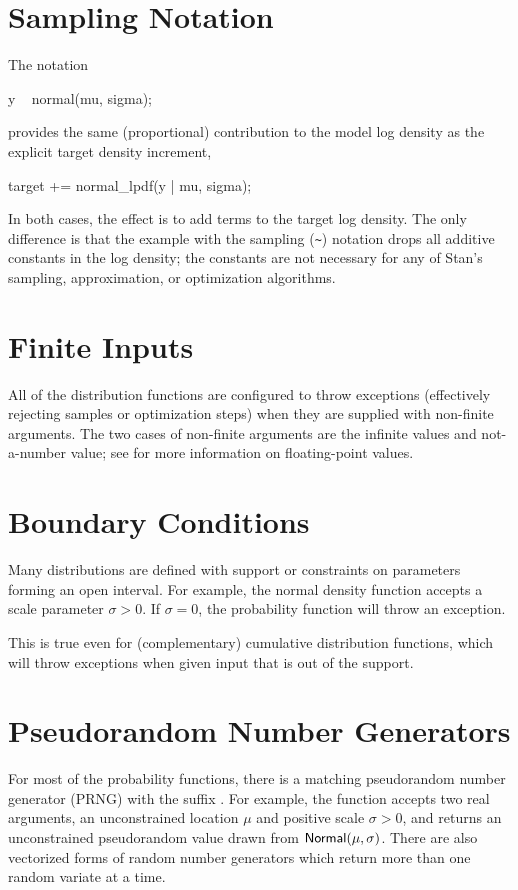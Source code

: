 \section{Sampling Notation}

The notation
%
\begin{stancode}
y ~ normal(mu, sigma);
\end{stancode}
%
provides the same (proportional) contribution to the model log density
as the explicit target density increment,
%
\begin{stancode}
target += normal_lpdf(y | mu, sigma);
\end{stancode}
%
In both cases, the effect is to add terms to the target log density.
The only difference is that the example with the sampling (\Verb|~|)
notation drops all additive constants in the log density;  the
constants are not necessary for any of Stan's sampling, approximation,
or optimization algorithms.

\section{Finite Inputs}

All of the distribution functions are configured to throw exceptions
(effectively rejecting samples or optimization steps) when they are
supplied with non-finite arguments.  The two cases of non-finite
arguments are the infinite values and not-a-number value;  see
 for more information on
floating-point values.


\section{Boundary Conditions}

Many distributions are defined with support or constraints on
parameters forming an open interval.  For example, the normal density
function accepts a scale parameter $\sigma > 0$.  If $\sigma = 0$, the
probability function will throw an exception.

This is true even for (complementary) cumulative distribution
functions, which will throw exceptions when given input that is out of
the support.

\section{Pseudorandom Number Generators}\label{distributions-prng.section}

For most of the probability functions, there is a matching
pseudorandom number generator (PRNG) with the suffix .
For example, the function  accepts two
real arguments, an unconstrained location $\mu$ and positive scale
$\sigma > 0$, and returns an unconstrained pseudorandom value drawn
from $\mbox{\sf Normal}(\mu,\sigma)$.  There are also vectorized forms
of random number generators which return more than one random variate
at a time.

